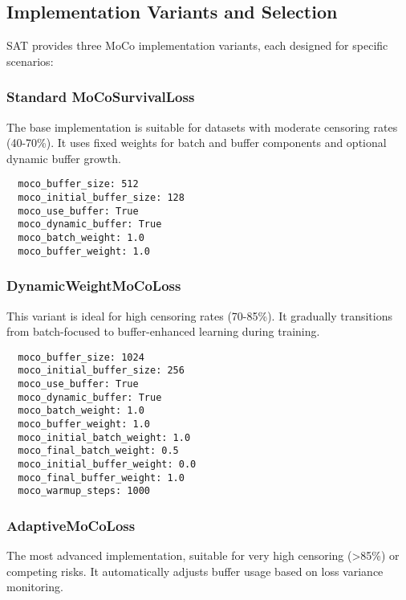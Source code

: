 \subsection{Implementation Variants and Selection}

SAT provides three MoCo implementation variants, each designed for specific scenarios:

\subsubsection{Standard MoCoSurvivalLoss}

The base implementation is suitable for datasets with moderate censoring rates (40-70\%). It uses fixed weights for batch and buffer components and optional dynamic buffer growth.

\begin{examplebox}[title=Standard MoCo Configuration]
\begin{verbatim}
  moco_buffer_size: 512
  moco_initial_buffer_size: 128
  moco_use_buffer: True
  moco_dynamic_buffer: True
  moco_batch_weight: 1.0
  moco_buffer_weight: 1.0
\end{verbatim}
\end{examplebox}

\subsubsection{DynamicWeightMoCoLoss}

This variant is ideal for high censoring rates (70-85\%). It gradually transitions from batch-focused to buffer-enhanced learning during training.

\begin{examplebox}[title=Dynamic Weight MoCo Configuration]
\begin{verbatim}
  moco_buffer_size: 1024
  moco_initial_buffer_size: 256
  moco_use_buffer: True
  moco_dynamic_buffer: True
  moco_batch_weight: 1.0
  moco_buffer_weight: 1.0
  moco_initial_batch_weight: 1.0
  moco_final_batch_weight: 0.5
  moco_initial_buffer_weight: 0.0
  moco_final_buffer_weight: 1.0
  moco_warmup_steps: 1000
\end{verbatim}
\end{examplebox}

\subsubsection{AdaptiveMoCoLoss}

The most advanced implementation, suitable for very high censoring (>85\%) or competing risks. It automatically adjusts buffer usage based on loss variance monitoring.

